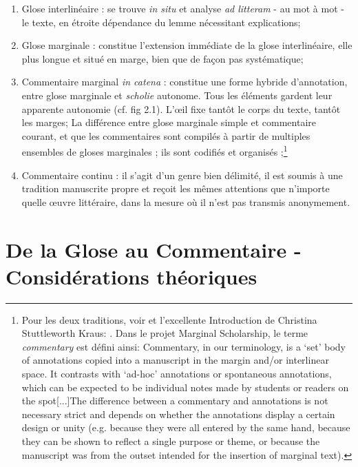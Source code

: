 \documentclass[a4paper, twoside, 12pt]{book}
\begin{document}
\begin{enumerate}
  \item Glose interlinéaire : se trouve \textit{in situ} et analyse \textit{ad litteram} - au mot à mot - le texte, en étroite dépendance du lemme nécessitant explications;
 \item Glose marginale : constitue l'extension immédiate de la glose interlinéaire, elle plus longue et situé en marge, bien que de façon pas systématique;
 \item Commentaire marginal \textit{in catena} : constitue une forme hybride d'annotation, entre glose marginale et \textit{scholie} autonome. Tous les éléments gardent leur apparente autonomie (cf. fig 2.1). L'œil fixe tantôt le corps du texte, tantôt les marges; La différence entre glose marginale simple et commentaire courant, et que  les commentaires sont compilés à partir de multiples ensembles de gloses marginales ; ils sont codifiés et organisés ;\footnote{Pour les deux traditions, voir \cite{teeuwen2015carolingian} et l'excellente Introduction de Christina Stuttleworth Kraus: \cite{kraus2002introduction}. Dans le projet \og{}Marginal Scholarship\fg{}, le terme \textit{commentary} est défini ainsi: Commentary, in our terminology, is a ‘set’ body of annotations copied into a manuscript in the margin and/or interlinear space. It contrasts with ‘ad-hoc’ annotations or spontaneous annotations, which can be expected to be individual notes made by students or readers on the spot[...]The difference between a commentary and annotations is not necessary strict and depends on whether the annotations display a certain design or unity (e.g. because they were all entered by the same hand, because they can be shown to reflect a single purpose or theme, or because the manuscript was from the outset intended for the insertion of marginal text).}
 \item Commentaire continu : il s'agit d'un genre bien délimité, il est soumis à une tradition manuscrite propre et reçoit les mêmes attentions que n’importe quelle œuvre littéraire, dans la mesure où il n’est pas transmis anonymement.
\end{enumerate}

\section{De la Glose au Commentaire - Considérations théoriques}
\end{document}

